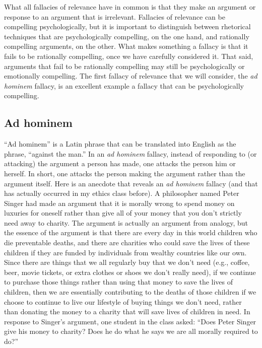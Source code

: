 What all fallacies of relevance have in common is that they make an argument or response to an argument that is irrelevant. Fallacies of relevance can be compelling psychologically, but it is important to distinguish between rhetorical techniques that are psychologically compelling, on the one hand, and rationally compelling arguments, on the other. What makes something a fallacy is that it fails to be rationally compelling, once we have carefully considered it. That said, arguments that fail to be rationally compelling may still be psychologically or emotionally compelling. The first fallacy of relevance that we will consider, the \textit{ad hominem} fallacy, is an excellent example a fallacy that can be psychologically compelling.

\subsection{Ad hominem}

``Ad hominem'' is a Latin phrase that can be translated into English as the phrase, ``against the man.'' In an \textit{ad hominem} fallacy, instead of responding to (or attacking) the argument a person has made, one attacks the person him or herself. In short, one attacks the person making the argument rather than the argument itself. Here is an anecdote that reveals an \textit{ad hominem} fallacy (and that has actually occurred in my ethics class before). A philosopher named Peter Singer had made an argument that it is morally wrong to spend money on luxuries for oneself rather than give all of your money that you don't strictly need away to charity. The argument is actually an argument from analogy, but the essence of the argument is that there are every day in this world children who die preventable deaths, and there are charities who could save the lives of these children if they are funded by individuals from wealthy countries like our own. Since there are things that we all regularly buy that we don't need (e.g., coffee, beer, movie tickets, or extra clothes or shoes we don't really need), if we continue to purchase those things rather than using that money to save the lives of children, then we are essentially contributing to the deaths of those children if we choose to continue to live our lifestyle of buying things we don't need, rather than donating the money to a charity that will save lives of children in need. In response to Singer's argument, one student in the class asked: ``Does Peter Singer give his money to charity? Does he do what he says we are all morally required to do?'' 

